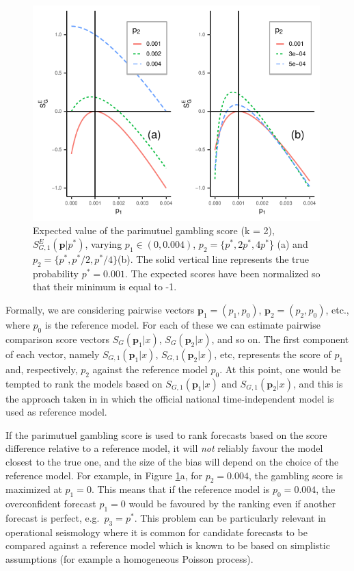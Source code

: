 \documentclass[referee,sn-basic]{sn-jnl}
\theoremstyle{thmstyleone}%
\theoremstyle{thmstyletwo}%
\theoremstyle{thmstylethree}%
\begin{document}
\begin{figure}
  \includegraphics[width = 0.99\textwidth]{figure2.pdf}
\caption{ Expected value of the parimutuel gambling score (k = 2), $S^E_{G,1}(\mathbf p \vert  p^*)$, varying $p_1 \in (0,0.004) $, $p_2 = \{p^*, 2p^*, 4p^*$\} (a) and $p_2 = \{p^*, p^*/2, p^*/4\}$(b). The solid vertical line represents the true probability $p^* = 0.001$. The expected scores have been normalized so that their minimum is equal to -1. }
\label{fig:2}
\end{figure}

Formally, we are considering pairwise vectors $\mathbf p_1 = (p_1, p_0)$, $\mathbf p_2 = (p_2, p_0)$, etc., where $p_0$ is the reference model. For each of these we can estimate pairwise comparison score vectors $S_G(\mathbf p_1\vert x)$, $S_G(\mathbf p_2\vert x)$, and so on. The first component of each vector, namely $S_{G,1}(\mathbf p_1\vert x)$, $S_{G,1}(\mathbf p_2\vert x)$, etc, represents the score of $p_1$ and, respectively, $p_2$ against the reference model $p_0$. At this point, one would be tempted to rank the models based on $S_{G,1}(\mathbf p_1\vert x)$ and $S_{G,1}(\mathbf p_2\vert x)$, and this is the approach taken in \cite{taroni2014assessing} in which the official national time-independent model \citep{gruppo2004redazione} is used as reference model.

If the parimutuel gambling score is used to rank forecasts based on the score difference relative to a reference model, it will \emph{not} reliably favour the model closest to the true one, and the size of the bias will depend on the choice of the reference model. For example, in Figure \ref{fig:2}a, for $p_2 = 0.004$, the gambling score is maximized at $p_1 = 0$. This means that if the reference model is $p_0 = 0.004$, the overconfident forecast $p_1 = 0$ would be favoured by the ranking even if another forecast is perfect, e.g.\ $p_3 = p^*$. This problem can be particularly relevant in operational seismology where it is common for candidate forecasts to be compared against a reference model which is known to be based on simplistic assumptions (for example a homogeneous Poisson process). 
\end{document}
